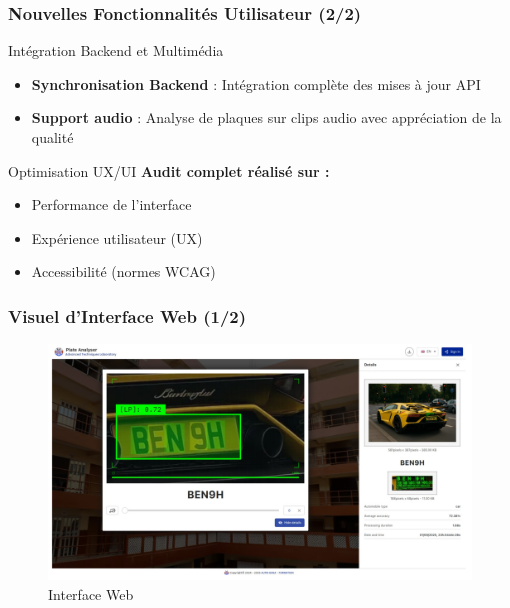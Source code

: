 \documentclass[
	11pt,
	aspectratio=169,
]{beamer}
\begin{document}
\begin{frame}
	\frametitle{Nouvelles Fonctionnalités Utilisateur (2/2)}
	
	\begin{block}{Intégration Backend et Multimédia}
		\begin{itemize}
			\item \textbf{Synchronisation Backend} : Intégration complète des mises à jour API
			\item \textbf{Support audio} : Analyse de plaques sur clips audio avec appréciation de la qualité
		\end{itemize}
	\end{block}
	
	\bigskip
	
	\begin{exampleblock}{Optimisation UX/UI}
		\textbf{Audit complet réalisé sur :}
		\begin{itemize}
			\item Performance de l'interface
			\item Expérience utilisateur (UX)
			\item Accessibilité (normes WCAG)
		\end{itemize}
	\end{exampleblock}
\end{frame}


\begin{frame}
	\frametitle{Visuel d'Interface Web (1/2)}
	
	\begin{figure}
		\includegraphics[width=0.9\linewidth]{Images/image1.png}
		\caption{Interface Web}
	\end{figure}
\end{frame}

\end{document}
